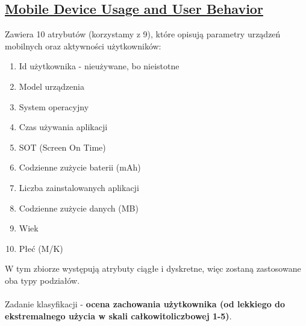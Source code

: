 \documentclass[11pt]{article}
\begin{document}
\subsection{\href{https://www.kaggle.com/datasets/valakhorasani/mobile-device-usage-and-user-behavior-dataset}{Mobile Device Usage and User Behavior}}
Zawiera 10 atrybutów (korzystamy z 9), które opisują parametry urządzeń mobilnych oraz aktywności użytkowników:
\label{sec:org2f897e3}
\begin{enumerate}
\item Id użytkownika - nieużywane, bo nieistotne
\item Model urządzenia
\item System operacyjny
\item Czas używania aplikacji
\item SOT (Screen On Time)
\item Codzienne zużycie baterii (mAh)
\item Liczba zainstalowanych aplikacji
\item Codzienne zużycie danych (MB)
\item Wiek
\item Płeć (M/K)
\end{enumerate}
W tym zbiorze występują atrybuty ciągłe i dyskretne, więc zostaną zastosowane oba typy podziałów.
\\\\
Zadanie klasyfikacji - \textbf{ocena zachowania użytkownika (od lekkiego do ekstremalnego użycia w skali całkowitoliczbowej 1-5)}.
\end{document}
